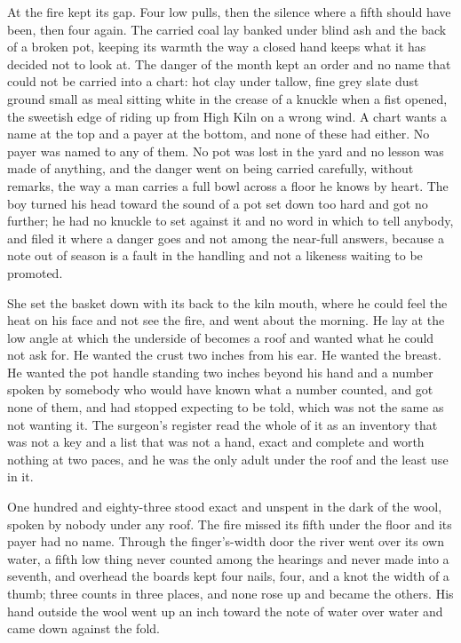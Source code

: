 At  the fire kept its gap. Four low pulls, then the silence where a fifth should have been, then four again. The carried coal lay banked under blind ash and the back of a broken pot, keeping its warmth the way a closed hand keeps what it has decided not to look at. The danger of the month kept an order and no name that could not be carried into a chart: hot clay under tallow, fine grey slate dust ground small as meal sitting white in the crease of a knuckle when a fist opened, the sweetish edge of  riding up from High Kiln on a wrong wind. A chart wants a name at the top and a payer at the bottom, and none of these had either. No payer was named to any of them. No pot was lost in the yard and no lesson was made of anything, and the danger went on being carried carefully, without remarks, the way a man carries a full bowl across a floor he knows by heart. The boy turned his head toward the sound of a pot set down too hard and got no further; he had no knuckle to set against it and no word in which to tell anybody, and filed it where a danger goes and not among the near-full answers, because a note out of season is a fault in the handling and not a likeness waiting to be promoted.

She set the basket down with its back to the kiln mouth, where he could feel the heat on his face and not see the fire, and went about the morning. He lay at the low angle at which the underside of  becomes a roof and wanted what he could not ask for. He wanted the crust two inches from his ear. He wanted the breast. He wanted the pot handle standing two inches beyond his hand and a number spoken by somebody who would have known what a number counted, and got none of them, and had stopped expecting to be told, which was not the same as not wanting it. The surgeon's register read the whole of it as an inventory that was not a key and a list that was not a hand, exact and complete and worth nothing at two paces, and he was the only adult under the roof and the least use in it.

One hundred and eighty-three stood exact and unspent in the dark of the wool, spoken by nobody under any roof. The fire missed its fifth under the floor and its payer had no name. Through the finger's-width door the river went over its own water, a fifth low thing never counted among the hearings and never made into a seventh, and overhead the boards kept four nails, four, and a knot the width of a thumb; three counts in three places, and none rose up and became the others. His hand outside the wool went up an inch toward the note of water over water and came down against the fold.
